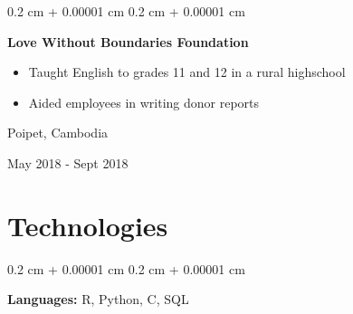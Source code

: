 \documentclass[10pt, letterpaper]{article}
\newenvironment{highlights}{
	\begin{itemize}[
		topsep=0.10 cm,
		parsep=0.10 cm,
		partopsep=0pt,
		itemsep=0pt,
		leftmargin=0.4 cm + 10pt
		]
	}{
	\end{itemize}
} %
\newenvironment{onecolentry}{
	\begin{adjustwidth}{
			0.2 cm + 0.00001 cm
		}{
			0.2 cm + 0.00001 cm
		}
	}{
	\end{adjustwidth}
} %
\newenvironment{twocolentry}[2][]{
	\onecolentry
	\def\secondColumn{#2}
	\setcolumnwidth{\fill, 4.5 cm}
	\begin{paracol}{2}
	}{
		\switchcolumn \raggedleft \secondColumn
	\end{paracol}
	\endonecolentry
} %
\let\hrefWithoutArrow\href
\renewcommand{\href}[2]{\hrefWithoutArrow{#1}{\ifthenelse{\equal{#2}{}}{ }{#2 }\raisebox{.15ex}{\footnotesize \faExternalLink*}}}
\begin{document}
	\begin{twocolentry}{
			Poipet, Cambodia 
			
			May 2018 - Sept 2018
		}
		\textbf{Love Without Boundaries Foundation}
		\begin{highlights}
			\item Taught English to grades 11 and 12 in a rural highschool
			\item Aided employees in writing donor reports
		\end{highlights}
	\end{twocolentry}
%	
%	
%	
%	
%	
%	
%	
	
	
	
	\section{Technologies}
	
	
	
	
	\begin{onecolentry}
		\textbf{Languages:} R, Python, C, SQL
	\end{onecolentry}
	
	
	
	
	
\end{document}
